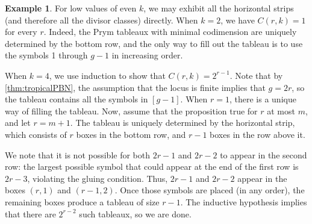 \documentclass[11pt,reqno]{amsart}
\newcommand{\yoav}[1]{{\color{blue} \sf  Yo$\alpha$v: [#1]}}
\theoremstyle{definition}
\theoremstyle{problem}
\newtheorem{example}[definition]{Example}
\theoremstyle{plain}
\newtheorem{proposition}[definition]{Proposition}
\theoremstyle{remark}
\theoremstyle{theorem}
\numberwithin{equation}{section}
\numberwithin{figure}{section}
\begin{document}
\begin{example}
 	For low values of even $k$,  we may exhibit all the horizontal strips (and therefore all the divisor classes) directly. When $k=2$, we have $C(r,k)=1$ for every $r$. Indeed, the Prym tableaux with minimal codimension are uniquely determined by the bottom row, and the only way to fill out the tableau is to use the symbols 1 through $g-1$ in increasing order.
 	
 	 When $k=4$, we use induction to show that $C(r,k)=2^{r-1}$. 
 	 Note that by \cref{thm:tropicalPBN}, the assumption that the locus is finite implies that $g=2r$, so the tableau contains all the symbols in $[g-1]$. 
 	  	 When $r=1$, there is a unique way of filling the tableau. 
 	  	 Now, assume that the proposition true for $r$ at most $m$, and let $r=m+1$. The tableau is uniquely determined by the horizontal strip, which consists of  $r$ boxes in the
 	 bottom row, and $r-1$ boxes in the  row above it. 
 	 
 	 We note that it is not possible for both $2r-1$ and $2r-2$ to appear in the second row: the largest possible symbol that could appear at the end of the first row is $2r-3$, violating the gluing condition. Thus, $2r-1$ and $2r-2$ appear in the boxes $(r,1)$ and $(r-1,2)$. Once those symbols are placed (in any order), 
 	 the remaining boxes produce a tableau of size $r-1$. The  inductive hypothesis implies that there are $2^{r-2}$ such tableaux, so we are done.
 	 	 
 	
\end{example}
%
%
\end{document}
